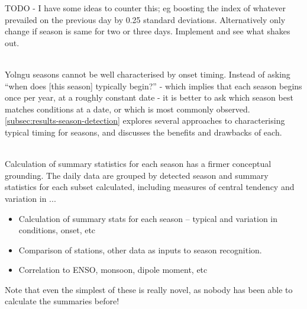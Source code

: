 TODO - I have some ideas to counter this; eg boosting the index of
whatever prevailed on the previous day by 0.25 standard deviations.
Alternatively only change if season is same for two or three days.
Implement and see what shakes out.

~\\

Yolngu seasons cannot be well characterised by onset timing.  Instead
of asking ``when does [this season] typically begin?'' - which implies
that each season begins once per year, at a roughly constant date -
it is better to ask which season best matches conditions at a date,
or which is most commonly observed.
%
\autoref{subsec:results-season-detection} explores several approaches
to characterising typical timing for seasons, and discusses the
benefits and drawbacks of each.

~\\

Calculation of summary statistics for each season has a firmer conceptual
grounding.  The daily data are grouped by detected season and summary statistics
for each subset calculated, including measures of central tendency and
variation in ...
\begin{itemize}
\item Calculation of summary stats for each season – typical and variation in conditions, onset, etc
\item Comparison of stations, other data as inputs to season recognition.
\item Correlation to ENSO, monsoon, dipole moment, etc
\end{itemize}

Note that even the simplest of these is really novel, as nobody has
been able to calculate the summaries before!

